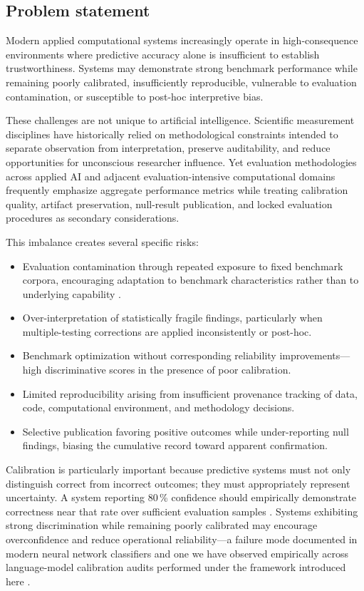 \documentclass[11pt]{article}
\begin{document}
\subsection{Problem statement}
\label{subsec:problem}

Modern applied computational systems increasingly operate in
high-consequence environments where predictive accuracy alone is
insufficient to establish trustworthiness. Systems may demonstrate
strong benchmark performance while remaining poorly calibrated,
insufficiently reproducible, vulnerable to evaluation contamination,
or susceptible to post-hoc interpretive bias.

These challenges are not unique to artificial intelligence.
Scientific measurement disciplines have historically relied on
methodological constraints intended to separate observation from
interpretation, preserve auditability, and reduce opportunities for
unconscious researcher influence. Yet evaluation methodologies
across applied AI and adjacent evaluation-intensive computational
domains frequently emphasize aggregate performance metrics while
treating calibration quality, artifact preservation, null-result
publication, and locked evaluation procedures as secondary
considerations.

This imbalance creates several specific risks:
\begin{itemize}
  \item Evaluation contamination through repeated exposure to fixed
    benchmark corpora, encouraging adaptation to benchmark
    characteristics rather than to underlying capability
    \cite{recht2019imagenet}.
  \item Over-interpretation of statistically fragile findings,
    particularly when multiple-testing corrections are applied
    inconsistently or post-hoc.
  \item Benchmark optimization without corresponding reliability
    improvements---high discriminative scores in the presence of
    poor calibration.
  \item Limited reproducibility arising from insufficient provenance
    tracking of data, code, computational environment, and
    methodology decisions.
  \item Selective publication favoring positive outcomes while
    under-reporting null findings, biasing the cumulative record
    toward apparent confirmation.
\end{itemize}

Calibration is particularly important because predictive systems
must not only distinguish correct from incorrect outcomes; they
must appropriately represent uncertainty. A system reporting
80\,\% confidence should empirically demonstrate correctness near
that rate over sufficient evaluation samples
\cite{guo2017calibration}. Systems exhibiting strong discrimination
while remaining poorly calibrated may encourage overconfidence and
reduce operational reliability---a failure mode documented in
modern neural network classifiers \cite{guo2017calibration,
minderer2021revisiting} and one we have observed empirically across
language-model calibration audits performed under the framework
introduced here \cite{dixon2026distilbert, dixon2026toxicbert,
dixon2026chatgptdetector}.
\end{document}
